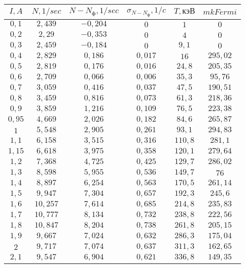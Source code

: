 \begin{tabular}{| c | c | c | c | c | c |}
\hline
$I, A$ & $N, 1/sec$ & $N - N_ф, 1/sec$ & $\sigma_{N - N_ф}, 1/c$ & $T, кэВ$ & $mkFermi$\\
\hline
$0,1$ & $2,439$ & $-0,204$ & $0$ & $1$ & $0$\\
\hline
$0,2$ & $2,29$ & $-0,353$ & $0$ & $4$ & $0$\\
\hline
$0,3$ & $2,459$ & $-0,184$ & $0$ & $9,1$ & $0$\\
\hline
$0,4$ & $2,829$ & $0,186$ & $0,017$ & $16$ & $295,02$\\
\hline
$0,5$ & $2,819$ & $0,176$ & $0,016$ & $24,8$ & $205,35$\\
\hline
$0,6$ & $2,709$ & $0,066$ & $0,006$ & $35,3$ & $95,76$\\
\hline
$0,7$ & $3,059$ & $0,416$ & $0,037$ & $47,5$ & $190,51$\\
\hline
$0,8$ & $3,459$ & $0,816$ & $0,073$ & $61,3$ & $218,36$\\
\hline
$0,9$ & $3,859$ & $1,216$ & $0,109$ & $76,5$ & $223,38$\\
\hline
$0,95$ & $4,669$ & $2,026$ & $0,182$ & $84,6$ & $265,87$\\
\hline
$1$ & $5,548$ & $2,905$ & $0,261$ & $93,1$ & $294,83$\\
\hline
$1,1$ & $6,158$ & $3,515$ & $0,316$ & $110,8$ & $281,1$\\
\hline
$1,15$ & $6,618$ & $3,975$ & $0,358$ & $120,1$ & $279,64$\\
\hline
$1,2$ & $7,368$ & $4,725$ & $0,425$ & $129,7$ & $286,02$\\
\hline
$1,3$ & $8,598$ & $5,955$ & $0,536$ & $149,7$ & $76$\\
\hline
$1,4$ & $8,897$ & $6,254$ & $0,563$ & $170,5$ & $261,14$\\
\hline
$1,5$ & $9,947$ & $7,304$ & $0,657$ & $192,3$ & $245,6$\\
\hline
$1,6$ & $10,257$ & $7,614$ & $0,685$ & $214,8$ & $235,83$\\
\hline
$1,7$ & $10,777$ & $8,134$ & $0,732$ & $238,8$ & $222,56$\\
\hline
$1,8$ & $10,847$ & $8,204$ & $0,738$ & $261,8$ & $205,15$\\
\hline
$1,9$ & $9,667$ & $7,024$ & $0,632$ & $286,3$ & $175,04$\\
\hline
$2$ & $9,717$ & $7,074$ & $0,637$ & $311,3$ & $162,65$\\
\hline
$2,1$ & $9,547$ & $6,904$ & $0,621$ & $336,8$ & $149,35$\\

\end{tabular}
